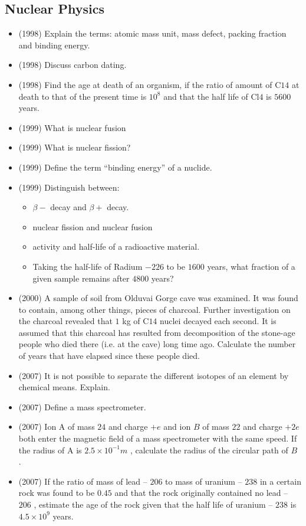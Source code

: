 \documentclass{article}
\begin{document}
\subsection{Nuclear Physics}
\begin{itemize}
\item (1998)  Explain the terms: atomic mass unit, mass defect, packing fraction and binding energy.
\item (1998)  Discuss carbon dating.
\item (1998)  Find the age at death of an organism, if the ratio of amount of C$ 14$ at death to that of the present time is $ 10^{8}$ and that the half life of Cl$ 4$ is $ 5600$ years.
\item (1999)  What is nuclear fusion 
\item (1999)  What is nuclear fission?
\item (1999)  Define the term “binding energy” of a nuclide.
\item (1999)  Distinguish between:\begin{itemize}
\item $ \beta -$ decay and $ \beta +$ decay.
\item nuclear fission and nuclear fusion
\item activity and half-life of a radioactive material.
\item Taking the half-life of Radium $ -226$ to be $ 1600$ years, what fraction of a given sample remains after $ 4800$ years?
\end{itemize}
\item (2000)  A sample of soil from Olduvai Gorge cave was examined. It was found to contain, among other things, pieces of charcoal. Further investigation on the charcoal revealed that $ 1$ kg of C$ 14$ nuclei decayed each second. It is assumed that this charcoal has resulted from decomposition of the stone-age people who died there (i.e. at the cave) long time ago. Calculate the number of years that have elapsed since these people died.
\item (2007)  It is not possible to separate the different isotopes of an element by chemical means.  Explain.
\item (2007)  Define a mass spectrometer. 
\item (2007)  Ion A of mass $ 24$ and charge $ +e$ and ion $ B$ of mass $ 22$ and charge $ +2e$ both enter the magnetic field of a mass spectrometer with the same speed. If the radius of A is $ 2.5 \times 10^{-1}m$ , calculate the radius of the circular path of $ B$ . 
\item (2007)  If the ratio of mass of lead – $ 206$  to mass of uranium – $ 238$ in a certain rock was found to be $ 0.45$ and that the rock originally contained no lead – $ 206$ , estimate the age of the rock given that the half life of uranium – $ 238$ is $ 4.5 \times 10^{9}$ years.

\end{itemize}
\end{document}
